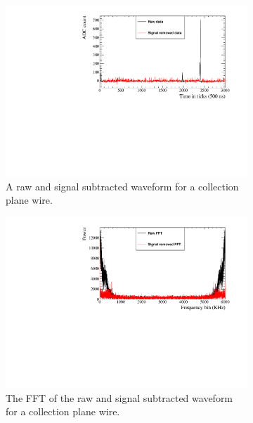 \begin{figure}[h!]
  \centering
  \begin{subfigure}{0.45\textwidth}
    \centering
    \includegraphics[width=\textwidth]{Waveforms}
    \caption{A raw and signal subtracted waveform for a collection plane wire.}
    \label{fig:FreqWaveform}
  \end{subfigure}
  \hspace{0.08\textwidth}
  \begin{subfigure}{0.45\textwidth}
    \centering
    \includegraphics[width=\textwidth]{NoiseFFTs}
    \caption{The FFT of the raw and signal subtracted waveform for a collection plane wire.}
    \label{fig:FreqFFT}
  \end{subfigure}
  \begin{subfigure}{0.45\textwidth}

\end{subfigure}
\end{figure}
